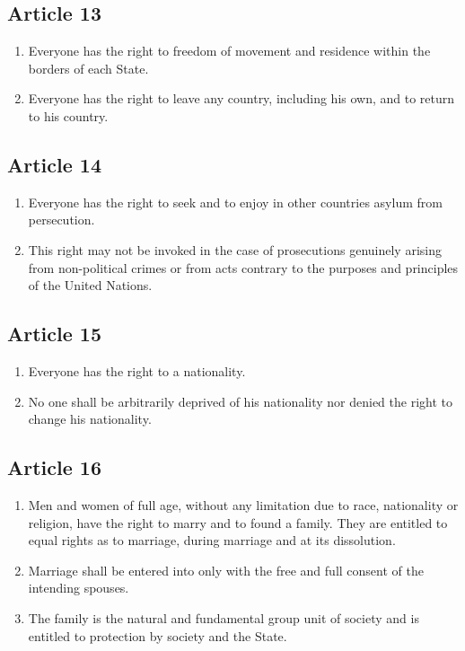 \documentclass[
  titlepage,
  openright,
  DIV=calc,
  toc=listof,
  listof=nochaptergap]{scrbook}
\begin{document}
\hypertarget{article-13}{%
\subsection{Article 13}\label{article-13}}

\begin{enumerate}
\def\labelenumi{\arabic{enumi}.}
\item
  Everyone has the right to freedom of movement and residence within the
  borders of each State.
\item
  Everyone has the right to leave any country, including his own, and to
  return to his country.
\end{enumerate}

\hypertarget{article-14}{%
\subsection{Article 14}\label{article-14}}

\begin{enumerate}
\def\labelenumi{\arabic{enumi}.}
\item
  Everyone has the right to seek and to enjoy in other countries asylum
  from persecution.
\item
  This right may not be invoked in the case of prosecutions genuinely
  arising from non-political crimes or from acts contrary to the
  purposes and principles of the United Nations.
\end{enumerate}

\hypertarget{article-15}{%
\subsection{Article 15}\label{article-15}}

\begin{enumerate}
\def\labelenumi{\arabic{enumi}.}
\item
  Everyone has the right to a nationality.
\item
  No one shall be arbitrarily deprived of his nationality nor denied the
  right to change his nationality.
\end{enumerate}

\hypertarget{article-16}{%
\subsection{Article 16}\label{article-16}}

\begin{enumerate}
\def\labelenumi{\arabic{enumi}.}
\item
  Men and women of full age, without any limitation due to race,
  nationality or religion, have the right to marry and to found a
  family. They are entitled to equal rights as to marriage, during
  marriage and at its dissolution.
\item
  Marriage shall be entered into only with the free and full consent of
  the intending spouses.
\item
  The family is the natural and fundamental group unit of society and is
  entitled to protection by society and the State.
\end{enumerate}
\end{document}
